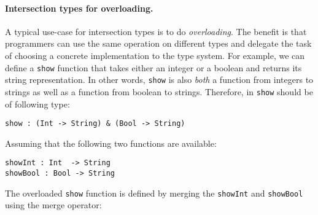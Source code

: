 \begin{comment}
The following table
summarizes the extent of support for intersection types in Java,
Scala, and \name.

\hspace{-13pt}\begin{tabular}{ l | c | c | c  }
                                   & Java       & Scala      & \name      \\ \hline
  Basic intersection types         & \checkmark & \checkmark & \checkmark \\ \hline
  Anonymous intersection types     &            & \checkmark & \checkmark \\ \hline
  Intersection of type parameters  &            & \checkmark & \checkmark \\ \hline
  Term-level intersection          &            &            & \checkmark
\end{tabular} \\
\end{comment}


\paragraph{Intersection types for overloading.}
A typical use-case for intersection types is to do
\emph{overloading}. The benefit is that programmers can use the same
operation on different types and delegate the task of choosing a
concrete implementation to the type system. For example, we can define
a \lstinline{show} function that takes either an integer or a boolean
and returns its string representation. In other words, \lstinline{show} is also
\emph{both} a function from integers to strings as well as a function
from boolean to strings.  Therefore, in \name \lstinline{show} should be of
following type:
\begin{lstlisting}
show : (Int -> String) & (Bool -> String)
\end{lstlisting}
Assuming that the following two functions are available:
\begin{lstlisting}
showInt : Int  -> String
showBool : Bool -> String
\end{lstlisting}

\noindent The overloaded \lstinline{show} function is defined by
merging the \lstinline{showInt} and \lstinline{showBool} using the
merge operator:

